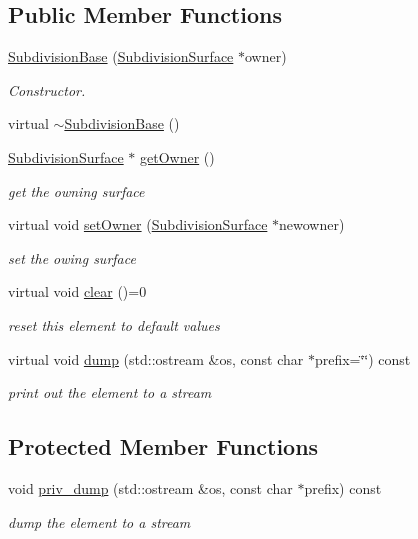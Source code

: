 \subsection*{Public Member Functions}
\begin{DoxyCompactItemize}
\item 
\hyperlink{classShipCAD_1_1SubdivisionBase_ad424b99e73d138f565a152ed0ee648cb}{Subdivision\-Base} (\hyperlink{classShipCAD_1_1SubdivisionSurface}{Subdivision\-Surface} $\ast$owner)
\begin{DoxyCompactList}\small\item\em Constructor. \end{DoxyCompactList}\item 
virtual \hyperlink{classShipCAD_1_1SubdivisionBase_a12b4adebcd9fb52d4d82d9ff469e144d}{$\sim$\-Subdivision\-Base} ()
\item 
\hyperlink{classShipCAD_1_1SubdivisionSurface}{Subdivision\-Surface} $\ast$ \hyperlink{classShipCAD_1_1SubdivisionBase_a0b9a68b5c7e6a20cf52a465f2387ffba}{get\-Owner} ()
\begin{DoxyCompactList}\small\item\em get the owning surface \end{DoxyCompactList}\item 
virtual void \hyperlink{classShipCAD_1_1SubdivisionBase_a8f64480f79c9260facc2d27cd19a36ed}{set\-Owner} (\hyperlink{classShipCAD_1_1SubdivisionSurface}{Subdivision\-Surface} $\ast$newowner)
\begin{DoxyCompactList}\small\item\em set the owing surface \end{DoxyCompactList}\item 
virtual void \hyperlink{classShipCAD_1_1SubdivisionBase_a851bb7f1931f9dd6e53b6f9df7b5b352}{clear} ()=0
\begin{DoxyCompactList}\small\item\em reset this element to default values \end{DoxyCompactList}\item 
virtual void \hyperlink{classShipCAD_1_1SubdivisionBase_a7807e64ac8d2acc3da572e03cf0523b6}{dump} (std\-::ostream \&os, const char $\ast$prefix=\char`\"{}\char`\"{}) const 
\begin{DoxyCompactList}\small\item\em print out the element to a stream \end{DoxyCompactList}\end{DoxyCompactItemize}
\subsection*{Protected Member Functions}
\begin{DoxyCompactItemize}
\item 
void \hyperlink{classShipCAD_1_1SubdivisionBase_a024aa781bbf2e54b6fb088e33126998e}{priv\-\_\-dump} (std\-::ostream \&os, const char $\ast$prefix) const 
\begin{DoxyCompactList}\small\item\em dump the element to a stream \end{DoxyCompactList}\end{DoxyCompactItemize}
